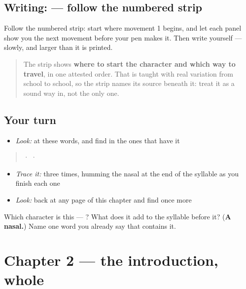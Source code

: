 \subsection*{Writing:  — follow the numbered strip}

Follow the numbered strip: start where movement 1 begins, and let each panel show you the next movement before your pen makes it. Then write  yourself — slowly, and larger than it is printed.

\begin{quote}
The strip shows \textbf{where to start the character and which way to travel}, in one attested order. That is taught with real variation from school to school, so the strip names its source beneath it: treat it as a sound way in, not the only one.
\end{quote}

\subsection*{Your turn}
\begin{itemize}
\raggedright
  \item \emph{Look:} at these words, and find  in the ones that have it
\end{itemize}

\begin{quote}
  ·    ·  
\end{quote}

\begin{itemize}
\raggedright
  \item \emph{Trace it:}  three times, humming the nasal at the end of the syllable as you finish each one
  \item \emph{Look:} back at any page of this chapter and find  once more
\end{itemize}

\begin{tcolorbox}[breakable,colback=teal!4,colframe=teal!35!black,title={Before you move on}]
Which character is this — ? What does it add to the syllable before it? (\textbf{A nasal.}) Name one word you already say that contains it.
\end{tcolorbox}
\section[Practice]{Chapter 2 — the introduction, whole}

